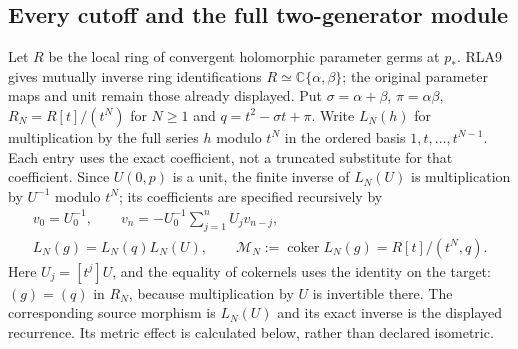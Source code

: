 \subsection{Every cutoff and the full two-generator module}

Let $R$ be the local ring of convergent holomorphic parameter germs
at $p_*$.  RLA9 gives mutually inverse ring identifications
$R\simeq\mathbb C\{\alpha,\beta\}$; the original parameter maps and
unit remain those already displayed.  Put $\sigma=\alpha+\beta$,
$\pi=\alpha\beta$, $R_N=R[t]/(t^N)$ for $N\ge1$ and
$q=t^2-\sigma t+\pi$.  Write $L_N(h)$ for multiplication by the
full series $h$ modulo $t^N$ in the ordered basis $1,t,\ldots,t^{N-1}$.
Each entry uses the exact coefficient, not a truncated substitute
for that coefficient.  Since $U(0,p)$ is a unit, the finite inverse
of $L_N(U)$ is multiplication by $U^{-1}$ modulo $t^N$; its
coefficients are specified recursively by
\[
 \begin{gathered}v_0=U_0^{-1},\qquad
 v_n=-U_0^{-1}\sum_{j=1}^nU_jv_{n-j},\\
 L_N(g)=L_N(q)L_N(U),\qquad
 \mathcal M_N:=\operatorname{coker}L_N(g)=R[t]/(t^N,q).
 \end{gathered}\tag{RLA11}
\]
Here $U_j=[t^j]U$, and the equality of cokernels uses the identity on
the target: $(g)=(q)$ in $R_N$, because multiplication by $U$ is
invertible there.  The corresponding source morphism is $L_N(U)$
and its exact inverse is the displayed recurrence.  Its metric
effect is calculated below, rather than declared isometric.

